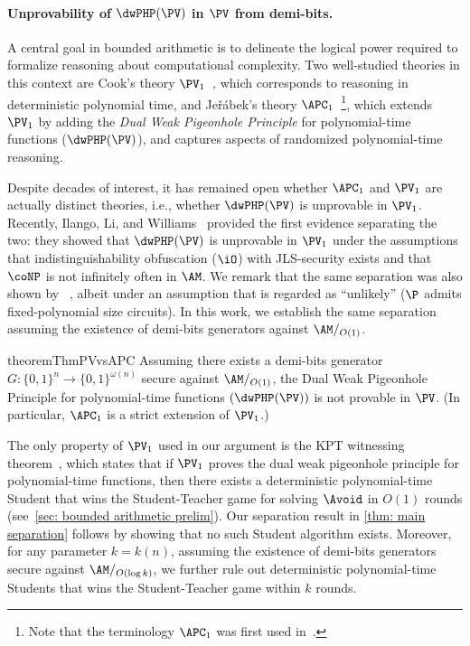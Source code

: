 \paragraph{Unprovability of $\dwPHP(\PV)$ in $\PV$ from demi-bits.} A central goal in bounded arithmetic is to delineate the logical power required to formalize reasoning about computational complexity. Two well-studied theories in this context are Cook’s theory $\PV_1$~\cite{Cook75}, which corresponds to reasoning in deterministic polynomial time, and Jeřábek’s theory $\APC_1$~\cite{Jerabek04, Jerabek07}\footnote{Note that the terminology $\APC_1$ was first used in~\cite{BussKT14}.}, which extends $\PV_1$ by adding the \emph{Dual Weak Pigeonhole Principle} for polynomial-time functions ($\dwPHP(\PV)$), and captures aspects of randomized polynomial-time reasoning.

Despite decades of interest, it has remained open whether $\APC_1$ and $\PV_1$ are actually distinct theories, i.e., whether $\dwPHP(\PV)$ is unprovable in $\PV_1$. Recently, Ilango, Li, and Williams~\cite{DBLP:conf/stoc/IlangoLW23} provided the first evidence separating the two: they showed that $\dwPHP(\PV)$ is unprovable in $\PV_1$ under the assumptions that indistinguishability obfuscation ($\iO$) with JLS-security exists and that $\coNP$ is not infinitely often in $\AM$. We remark that the same separation was also shown by \Krajicek~\cite{Krajicek21}, albeit under an assumption that is regarded as ``unlikely'' ($\P$ admits fixed-polynomial size circuits). In this work, we establish the same separation assuming the existence of demi-bits generators against $\AM/_{O(1)}$.

\begin{restatable}{theorem}{ThmPVvsAPC}\label{thm: main separation}
    Assuming there exists a demi-bits generator $G: \{0,1\}^n \to \{0,1\}^{\omega(n)}$ secure against $\AM/_{O(1)}$, the Dual Weak Pigeonhole Principle for polynomial-time functions $(\dwPHP(\PV))$ is not provable in $\PV$. (In particular, $\APC_1$ is a strict extension of $\PV_1$.)
\end{restatable}

The only property of $\PV_1$ used in our argument is the KPT witnessing theorem~\cite{KRAJICEK1991143}, which states that if $\PV_1$ proves the dual weak pigeonhole principle for polynomial-time functions, then there exists a deterministic polynomial-time Student that wins the Student-Teacher game for solving $\Avoid$ in $O(1)$ rounds (see~\autoref{sec: bounded arithmetic prelim}). Our separation result in \autoref{thm: main separation} follows by showing that no such Student algorithm exists.%
Moreover, for any parameter $k = k(n)$, assuming the existence of demi-bits generators secure against $\AM/_{O(\log k)}$, we further rule out deterministic polynomial-time Students that wins the Student-Teacher game within $k$ rounds.%


